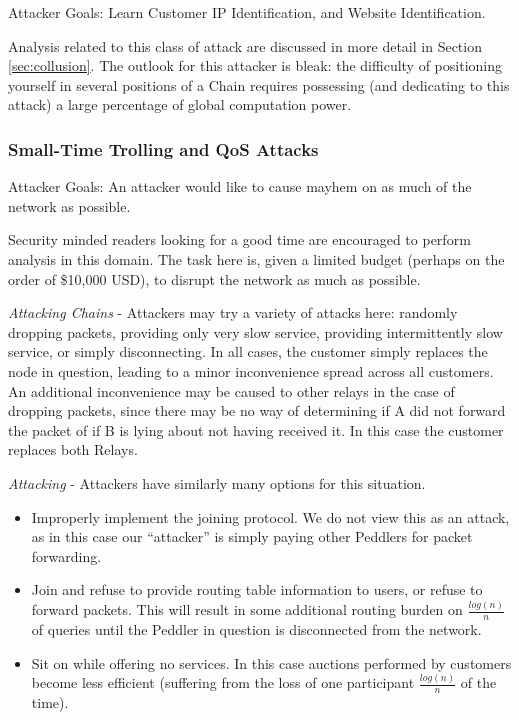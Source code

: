 Attacker Goals: Learn Customer IP Identification, and Website Identification.

Analysis related to this class of attack are discussed in more detail
in Section \ref{sec:collusion}. The outlook for this attacker is
bleak: the difficulty of positioning yourself in several positions of
a Chain requires possessing (and dedicating to this attack) a large
percentage of global computation power.

\subsubsection*{Small-Time Trolling and QoS Attacks}

Attacker Goals: An attacker would like to cause mayhem on as much of the network as possible.

Security minded readers looking for a good time are encouraged to
perform analysis in this domain. The task here is, given a limited
budget (perhaps on the order of \$10,000 USD), to disrupt the network
as much as possible.

\textit{Attacking Chains} - Attackers may try a variety of attacks here: randomly dropping
packets, providing only very slow service, providing intermittently
slow service, or simply disconnecting. In all cases, the customer
simply replaces the node in question, leading to a minor inconvenience
spread across all customers. An additional inconvenience may be caused
to other relays in the case of dropping packets, since there may be no
way of determining if A did not forward the packet of if B is lying
about not having received it. In this case the customer replaces both
Relays.

\textit{Attacking \tOM{}} - Attackers have similarly many options for this situation.
\begin{itemize}
  \item Improperly implement the joining protocol. We do not
  view this as an attack, as in this case our ``attacker'' is simply
  paying other Peddlers for packet forwarding.

  \item Join \tOM{} and refuse to provide routing table
  information to users, or refuse to forward packets. This will result
  in some additional routing burden on $\frac{log(n)}{n}$ of \tOM{}
  queries until the Peddler in question is disconnected from the
  network.

  \item Sit on \tOM{} while offering no services. In this
  case auctions performed by customers become less efficient (suffering
  from the loss of one participant $\frac{log(n)}{n}$ of the time).
\end{itemize}





